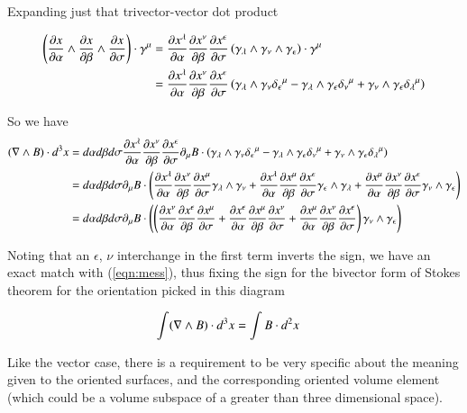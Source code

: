Expanding just that trivector-vector dot product

\begin{align*}
\left( \frac{\partial {x}}{\partial {\alpha}} \wedge \frac{\partial {x}}{\partial {\beta}} \wedge \frac{\partial {x}}{\partial {\sigma}} \right) \cdot \gamma^\mu 
&=
\frac{\partial {x^\lambda}}{\partial {\alpha}} \frac{\partial {x^\nu}}{\partial {\beta}} \frac{\partial {x^\epsilon}}{\partial {\sigma}} \left( \gamma_\lambda \wedge \gamma_\nu \wedge \gamma_\epsilon \right) \cdot \gamma^\mu  \\
&=
\frac{\partial {x^\lambda}}{\partial {\alpha}} \frac{\partial {x^\nu}}{\partial {\beta}} \frac{\partial {x^\epsilon}}{\partial {\sigma}} \left( 
\gamma_\lambda \wedge \gamma_\nu {\delta_\epsilon}^\mu
-\gamma_\lambda \wedge \gamma_\epsilon {\delta_\nu}^\mu
+\gamma_\nu \wedge \gamma_\epsilon {\delta_\lambda}^\mu
\right) 
\end{align*}

So we have
\begin{align*}
(\nabla \wedge B) \cdot d^3 x
&=
d\alpha d\beta d\sigma \frac{\partial {x^\lambda}}{\partial {\alpha}} \frac{\partial {x^\nu}}{\partial {\beta}} \frac{\partial {x^\epsilon}}{\partial {\sigma}} \partial_\mu B \cdot \left( 
\gamma_\lambda \wedge \gamma_\nu {\delta_\epsilon}^\mu
-\gamma_\lambda \wedge \gamma_\epsilon {\delta_\nu}^\mu
+\gamma_\nu \wedge \gamma_\epsilon {\delta_\lambda}^\mu
\right) 
\\
&=
d\alpha d\beta d\sigma 
\partial_\mu B \cdot \left( 
  \frac{\partial {x^\lambda}}{\partial {\alpha}} \frac{\partial {x^\nu}}{\partial {\beta}} \frac{\partial {x^\mu}}{\partial {\sigma}} \gamma_\lambda \wedge \gamma_\nu 
+ \frac{\partial {x^\lambda}}{\partial {\alpha}} \frac{\partial {x^\mu}}{\partial {\beta}} \frac{\partial {x^\epsilon}}{\partial {\sigma}} \gamma_\epsilon \wedge \gamma_\lambda 
+ \frac{\partial {x^\mu}}{\partial {\alpha}} \frac{\partial {x^\nu}}{\partial {\beta}} \frac{\partial {x^\epsilon}}{\partial {\sigma}} \gamma_\nu \wedge \gamma_\epsilon 
\right) 
\\
&=
d\alpha d\beta d\sigma 
\partial_\mu B \cdot 
\left( 
\left( 
  \frac{\partial {x^\nu}}{\partial {\alpha}} \frac{\partial {x^\epsilon}}{\partial {\beta}} \frac{\partial {x^\mu}}{\partial {\sigma}} 
+ \frac{\partial {x^\epsilon}}{\partial {\alpha}} \frac{\partial {x^\mu}}{\partial {\beta}} \frac{\partial {x^\nu}}{\partial {\sigma}} 
+ \frac{\partial {x^\mu}}{\partial {\alpha}} \frac{\partial {x^\nu}}{\partial {\beta}} \frac{\partial {x^\epsilon}}{\partial {\sigma}} 
\right) 
\gamma_\nu \wedge \gamma_\epsilon 
\right) 
\\
\end{align*}

Noting that an $\epsilon$, $\nu$ interchange in the first term inverts the sign, we have an exact match with (\ref{eqn:mess}), thus fixing the sign for the
bivector form of Stokes theorem for the orientation picked in this diagram

\begin{align}
\int (\nabla \wedge B) \cdot d^3 x &= \int B \cdot d^2 x
\end{align}

Like the vector case, there is a requirement to be very specific about the meaning given to the oriented surfaces, and the corresponding oriented volume element (which could be a volume subspace of a greater than three dimensional space).



\EndNoBibArticle
